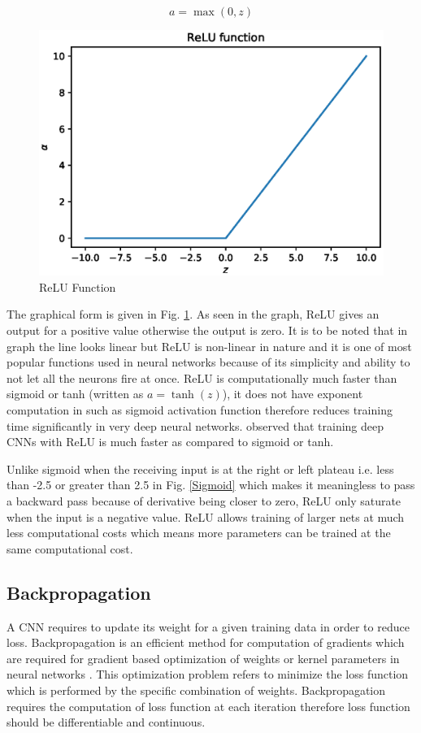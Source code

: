 \documentclass[11pt]{article}
\begin{document}
\begin{equation}
a = \max (0, z)
\end{equation}


\begin{figure}[ht!]
	\centering
	\includegraphics[width=.6\linewidth]{files/cnn_architecture/relu.eps}
	\caption{ReLU Function}
	\label{relu}
\end{figure}

The graphical form is given in Fig. \ref{relu}. As seen in the graph, ReLU gives an output for a positive value otherwise the output is zero. It is to be noted that in graph the line looks linear but ReLU is non-linear in nature and it is one of most popular functions used in neural networks because of its simplicity and ability to not let all the neurons fire at once. ReLU is computationally much faster than sigmoid or tanh (written as $a=\tanh (z)$), it does not have exponent computation in such as sigmoid activation function therefore reduces training time significantly in very deep neural networks. \cite{krizhevsky2012imagenet} observed that training deep CNNs with ReLU is much faster as compared to sigmoid or tanh.

Unlike sigmoid when the receiving input is at the right or left plateau i.e. less than -2.5 or greater than 2.5 in Fig. \ref{Sigmoid} which makes it meaningless to pass a backward pass because of derivative being closer to zero, ReLU only saturate when the input is a negative value. ReLU allows training of larger nets at much less computational costs which means more parameters can be trained at the same computational cost.

\subsection{Backpropagation}
A CNN requires to update its weight for a given training data in order to reduce loss. Backpropagation is an efficient method for computation of gradients which are required for gradient based optimization of weights or kernel parameters in neural networks \cite{rumelhart1988learning}. This optimization problem refers to minimize the loss function which is performed by the specific combination of weights. Backpropagation requires the computation of loss function at each iteration therefore loss function should be differentiable and continuous.
\end{document}
